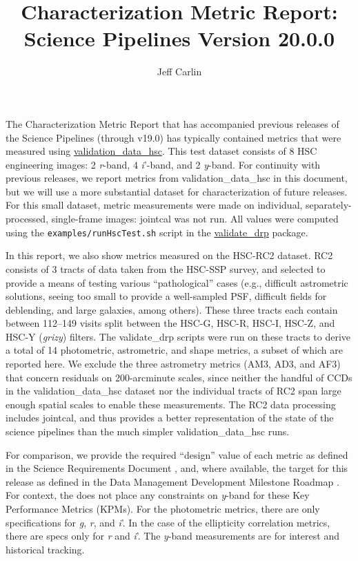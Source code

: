 \documentclass[DM,lsstdraft,toc]{lsstdoc}
\title{Characterization Metric Report: Science Pipelines Version 20.0.0}
\author{%
Jeff Carlin
}
\date{\vcsDate}
\begin{document}
\maketitle


The Characterization Metric Report that has accompanied previous releases of the Science Pipelines (through v19.0) has typically contained metrics that were measured using \href{https://github.com/lsst/validation_data_hsc}{validation\_data\_hsc}. This test dataset consists of 8 HSC engineering images: 2 \emph{r}-band, 4 \emph{i}'-band, and 2 \emph{y}-band. For continuity with previous releases, we report metrics from validation\_data\_hsc in this document, but we will use a more substantial dataset for characterization of future releases. For this small dataset, metric measurements were made on individual, separately-processed, single-frame images: jointcal was not run. All values were computed using the \texttt{examples/runHscTest.sh} script in the \href{https://github.com/lsst/validate_drp}{validate\_drp} package.

In this report, we also show metrics measured on the HSC-RC2 dataset. RC2 consists of 3 tracts of data taken from the HSC-SSP survey, and selected to provide a means of testing various ``pathological'' cases (e.g., difficult astrometric solutions, seeing too small to provide a well-sampled PSF, difficult fields for deblending, and large galaxies, among others). These three tracts each contain between 112--149 visits split between the HSC-G, HSC-R, HSC-I, HSC-Z, and HSC-Y (\emph{grizy}) filters. The validate\_drp scripts were run on these tracts to derive a total of 14 photometric, astrometric, and shape metrics, a subset of which are reported here. We exclude the three astrometry metrics (AM3, AD3, and AF3) that concern residuals on 200-arcminute scales, since neither the handful of CCDs in the validation\_data\_hsc dataset nor the individual tracts of RC2 span large enough spatial scales to enable these measurements. The RC2 data processing includes jointcal, and thus provides a better representation of the state of the science pipelines than the much simpler validation\_data\_hsc runs.

For comparison, we provide the \SRD required ``design'' value of each metric as defined in the Science Requirements Document , and, where available, the target for this release as defined in the Data Management Development Milestone Roadmap . For context, the \SRD does not place any constraints on \emph{y}-band for these Key Performance Metrics (KPMs).  For the photometric metrics, there are only specifications for \emph{g}, \emph{r}, and \emph{i}'. In the case of the ellipticity correlation metrics, there are specs only for \emph{r} and \emph{i}'. The \emph{y}-band measurements are for interest and historical tracking.
\end{document}
